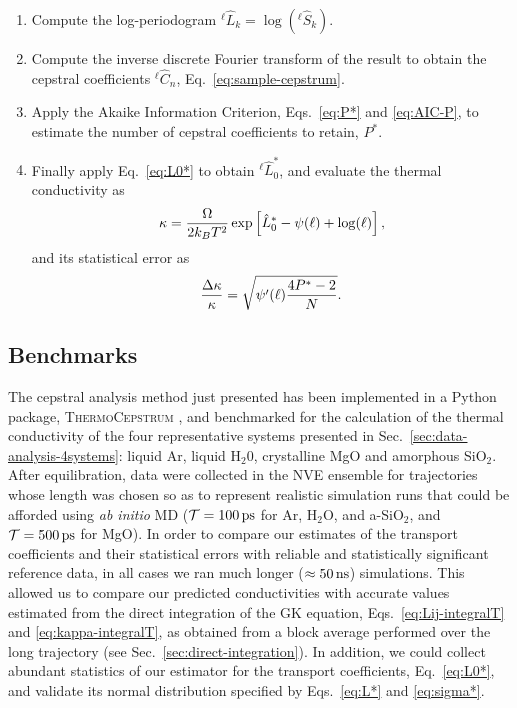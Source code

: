 \begin{enumerate}
    \item Compute the log-periodogram ${^{\ell\!}}\hat{L}_k = \log({^{\ell\!}}\hat{S}_k)$.
    \item Compute the inverse discrete Fourier transform of the result to obtain the cepstral coefficients ${^{\ell\!}}\hat{C}_n$, Eq.~\eqref{eq:sample-cepstrum}. 
    \item Apply the Akaike Information Criterion, Eqs.~\eqref{eq:P*} and \eqref{eq:AIC-P}, to estimate the number of cepstral coefficients to retain, $P^*$.
    \item Finally apply Eq.~\eqref{eq:L0*} to obtain ${^{\ell\!}}\hat{L}_0^*$, and evaluate the thermal conductivity as
    \begin{equation}
        \kappa = \frac{{\mathrm\Omega}}{2k_B T^2} \exp\left[\hat{L}_0^* - \psi(\ell) + \log(\ell) \right],
    \end{equation}
    and its statistical error as
    \begin{equation}
        \frac{{\mathrm\Delta}\kappa}{\kappa} = \sqrt{\psi'(\ell) \frac{4P^{*}-2}{N}}.
    \end{equation}
\end{enumerate}


\subsection{Benchmarks}  \label{sec:cepstral-benchmarks}
The cepstral analysis method just presented has been implemented in a Python package, \textsc{ThermoCepstrum} \cite{thermocepstrum}, and benchmarked for the calculation of the thermal conductivity of the four representative systems presented in Sec.~\ref{sec:data-analysis-4systems}: liquid Ar, liquid H$_2$0, crystalline MgO and amorphous SiO$_2$.
After equilibration, data were collected in the NVE ensemble for trajectories whose length was chosen so as to represent realistic simulation runs that could be afforded using \emph{ab initio} MD ($\mathcal{T} = 100\,\mathrm{ps}$ for Ar, H$_2$O, and a-SiO$_2$, and $\mathcal{T} =500\,\mathrm{ps}$ for MgO). 
In order to compare our estimates of the transport coefficients and their statistical errors with reliable and statistically significant reference data, in all cases we ran much longer ($\approx 50\,\mathrm{ns}$) simulations. 
This allowed us to compare our predicted conductivities with accurate values estimated from the direct integration of the GK equation, Eqs.~\eqref{eq:Lij-integralT} and \eqref{eq:kappa-integralT}, as obtained from a block average \cite{Frenkel2001} performed over the long trajectory (see Sec.~\ref{sec:direct-integration}). 
In addition, we could collect abundant statistics of our estimator for the transport coefficients, Eq.~\eqref{eq:L0*}, and validate its normal distribution specified by Eqs.~\eqref{eq:L*} and \eqref{eq:sigma*}. 

